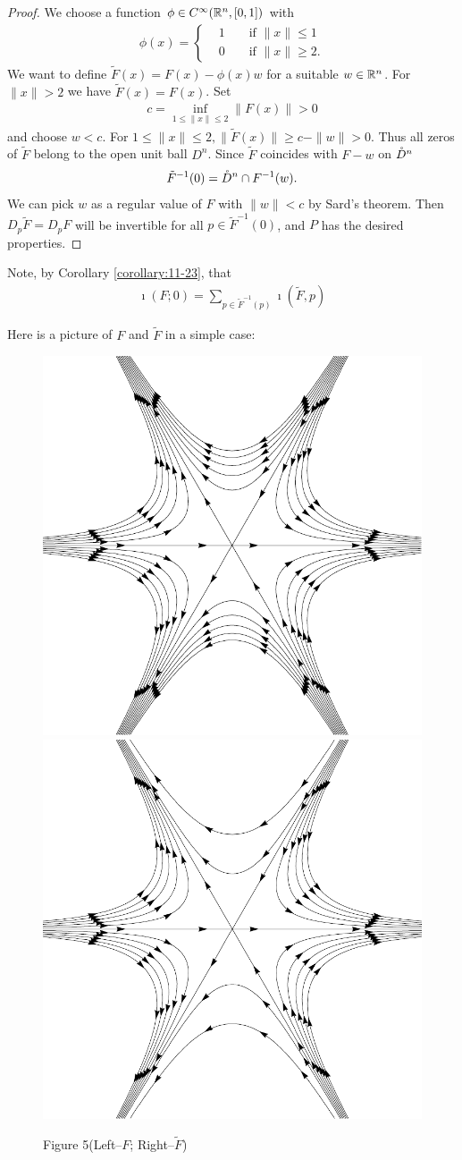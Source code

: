 \begin{proof}
  We choose a function $\phi\in C^\infty(\mathbb{R}^n, [0, 1])$ with 
  \begin{align*}
    \phi(x) = \left\{\begin{aligned}
      & 1 && \text{ if } \|x\|\le 1 \\
      & 0 && \text{ if } \|x\|\ge 2.
    \end{aligned}\right.
  \end{align*}
  We want to define $\tilde{F}(x) = F(x) - \phi(x)w$ for a suitable $w\in\mathbb{R}^n$. 
  For $\|x\|> 2$ we have $\tilde{F}(x) = F(x)$. Set
  \begin{align*}
    c = \inf_{1\le \|x\|\le 2} \|F(x)\| > 0
  \end{align*}
  and choose $w<c$. For $1\le\|x\|\le 2, \|\tilde{F}(x)\|\ge c-\|w\|>0$. Thus all 
  zeros of $\tilde{F}$ belong to the open unit ball $D^n$. Since $\tilde{F}$ coincides with 
  $F-w$ on $\mathring{D}^n$ 
  \begin{align*}
    \tilde{F}^{-1}(0) = \mathring{D}^n\cap F^{-1}(w).
  \end{align*}
  We can pick $w$ as a regular value of $F$ with $\|w\|<c$ by Sard's theorem. Then
  $D_p\tilde{F} = D_pF$ will be invertible for all $p\in\tilde{F}^{-1}(0)$, and $P$ has 
  the desired properties.
\end{proof}

Note, by Corollary \ref{corollary:11-23}, that
\begin{align}
  \imath(F; 0) = \sum_{p\in \tilde{F}^{-1}(p)}^{}{\imath(\tilde{F}, p)}
\end{align}

Here is a picture of $F$ and $\tilde{F}$ in a simple case:
\begin{figure}[!htb]
  \centering
  \includegraphics[width=.4\linewidth]{./pics/chap11-5-I.pdf}\quad
  \includegraphics[width=.4\linewidth]{./pics/chap11-5-II.pdf}
  \caption{Figure 5(Left--$F$; Right--$\tilde{F}$)}
  \label{fig:11-5}
\end{figure}

